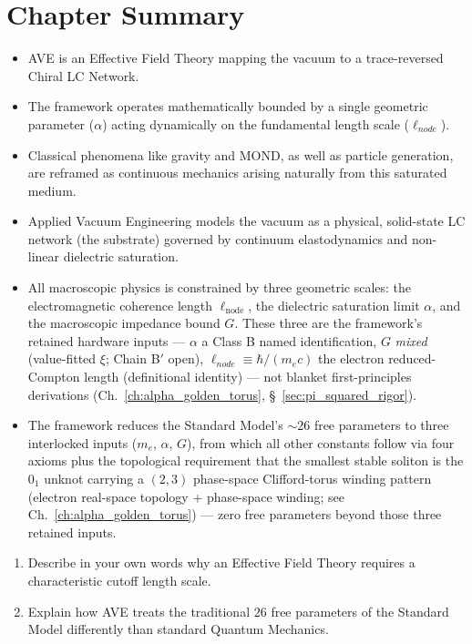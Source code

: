 \section*{Chapter Summary}
\begin{itemize}
    \item AVE is an Effective Field Theory mapping the vacuum to a trace-reversed Chiral LC Network.
    \item The framework operates mathematically bounded by a single geometric parameter ($\alpha$) acting dynamically on the fundamental length scale ($\ell_{node}$).
    \item Classical phenomena like gravity and MOND, as well as particle generation, are reframed as continuous mechanics arising naturally from this saturated medium.
\end{itemize}

\begin{summarybox}
\begin{itemize}
    \item Applied Vacuum Engineering models the vacuum as a physical, solid-state LC network (the substrate) governed by continuum elastodynamics and non-linear dielectric saturation.
    \item All macroscopic physics is constrained by three geometric scales: the electromagnetic coherence length $\ell_{\text{node}}$, the dielectric saturation limit $\alpha$, and the macroscopic impedance bound $G$. These three are the framework's retained hardware inputs --- $\alpha$ a Class B named identification, $G$ \emph{mixed} (value-fitted $\xi$; Chain B$'$ open), $\ell_{node} \equiv \hbar/(m_e c)$ the electron reduced-Compton length (definitional identity) --- not blanket first-principles derivations (Ch.~\ref{ch:alpha_golden_torus}, \S~\ref{sec:pi_squared_rigor}).
    \item The framework reduces the Standard Model's $\sim$26 free parameters to three interlocked inputs ($m_e$, $\alpha$, $G$), from which all other constants follow via four axioms plus the topological requirement that the smallest stable soliton is the $0_1$ unknot carrying a $(2,3)$ phase-space Clifford-torus winding pattern (electron real-space topology + phase-space winding; see Ch.~\ref{ch:alpha_golden_torus}) --- zero free parameters beyond those three retained inputs.
\end{itemize}
\end{summarybox}

\begin{exercisebox}
\begin{enumerate}
    \item Describe in your own words why an Effective Field Theory requires a characteristic cutoff length scale.
    \item Explain how AVE treats the traditional $26$ free parameters of the Standard Model differently than standard Quantum Mechanics.
\end{enumerate}
\end{exercisebox}